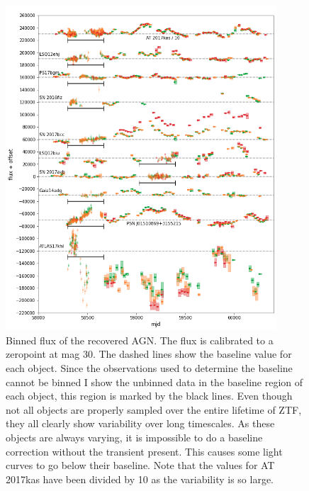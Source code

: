 \documentclass[a4paper,oneside,12pt, class=Latex/Classes/PhDthesisPSnPDF, crop=false]{standalone}
\begin{document}
\begin{figure}
    \centering
    \includegraphics[width=0.9\textwidth]{../Images/chapter_4/non-transients_AGN.png}
    \caption{Binned flux of the recovered AGN. The flux is calibrated to a zeropoint at mag 30. The dashed lines show the baseline value for each object. Since the observations used to determine the baseline cannot be binned I show the unbinned data in the baseline region of each object, this region is marked by the black lines. Even though not all objects are properly sampled over the entire lifetime of ZTF, they all clearly show variability over long timescales. As these objects are always varying, it is impossible to do a baseline correction without the transient present. This causes some light curves to go below their baseline. Note that the values for AT 2017kas have been divided by 10 as the variability is so large.}
    \label{non-transients_AGN}
\end{figure}
\end{document}
